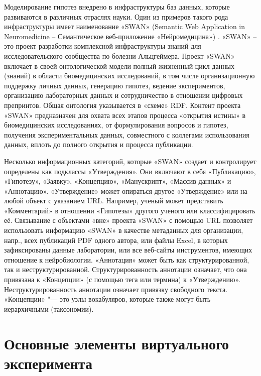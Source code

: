 Моделирование гипотез внедрено в инфраструктуры баз данных, которые развиваются в различных отраслях науки. Один из 
примеров такого рода инфраструктуры имеет наименование «SWAN» (Semantic Web Application in Neuromedicine – 
Семантическое веб-приложение «Нейромедицина») \cite{gao2006swan}. «SWAN» – это проект разработки комплексной 
инфраструктуры знаний для исследовательского сообщества по болезни Альцгеймера. Проект «SWAN» включает в своей 
онтологической модели полный жизненный цикл данных (знаний) в области биомедицинских исследований, в том числе 
организационную поддержку личных данных, генерацию гипотез, ведение экспериментов, организацию лабораторных данных 
и сотрудничество в отношении цифровых препринтов. Общая онтология указывается в «схеме» RDF. Контент проекта «SWAN» 
предназначен для охвата всех этапов процесса «открытия истины» в биомедицинских исследованиях, от формулирования 
вопросов и гипотез, получения экспериментальных данных, совместного с коллегами использования данных, вплоть до полного 
открытия и процесса публикации.

Несколько информационных категорий, которые «SWAN» создает и контролирует определены как подклассы «Утверждения». 
Они включают в себя «Публикацию», «Гипотезу», «Заявку», «Концепцию», «Манускрипт», «Массив данных» и «Аннотацию». 
«Утверждение» может опираться другое «Утверждение» или на любой объект с указанием URL. Например, ученый может 
представить «Комментарий» в отношении «Гипотезы» другого ученого или классифицировать её. Связывание с объектами 
«вне» проекта «SWAN» с помощью URL позволяет использовать информацию «SWAN» в качестве метаданных для организации, 
напр., всех публикаций PDF одного автора, или файлы Excel, в которых зафиксированы данные лаборатории, или все 
веб-сайты инструментов, имеющих отношение к нейробиологии. «Аннотация» может быть как структурированной, так и 
неструктурированной. Структурированность аннотации означает, что она привязана к «Концепции» (с помощью тега или 
термина) к «Утверждению». Неструктурированность аннотации означает привязку свободного текста. 
«Концепции» "--- это узлы вокабуляров, которые также могут быть иерархичными (таксономии).

\section{Основные элементы виртуального эксперимента} \label{sect2_1}

